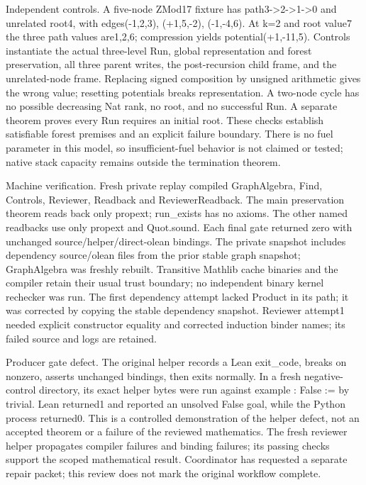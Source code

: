 \documentclass[10pt]{article}
\begin{document}
Independent controls. A five-node ZMod17 fixture has path3->2->1->0 and unrelated root4, with edges(-1,2,3), (+1,5,-2), (-1,-4,6). At k=2 and root value7 the three path values are1,2,6; compression yields potential(+1,-11,5). Controls instantiate the actual three-level Run, global representation and forest preservation, all three parent writes, the post-recursion child frame, and the unrelated-node frame. Replacing signed composition by unsigned arithmetic gives the wrong value; resetting potentials breaks representation. A two-node cycle has no possible decreasing Nat rank, no root, and no successful Run. A separate theorem proves every Run requires an initial root. These checks establish satisfiable forest premises and an explicit failure boundary. There is no fuel parameter in this model, so insufficient-fuel behavior is not claimed or tested; native stack capacity remains outside the termination theorem.\par\medskip
Machine verification. Fresh private replay compiled GraphAlgebra, Find, Controls, Reviewer, Readback and ReviewerReadback. The main preservation theorem reads back only propext; run\_exists has no axioms. The other named readbacks use only propext and Quot.sound. Each final gate returned zero with unchanged source/helper/direct-olean bindings. The private snapshot includes dependency source/olean files from the prior stable graph snapshot; GraphAlgebra was freshly rebuilt. Transitive Mathlib cache binaries and the compiler retain their usual trust boundary; no independent binary kernel rechecker was run. The first dependency attempt lacked Product in its path; it was corrected by copying the stable dependency snapshot. Reviewer attempt1 needed explicit constructor equality and corrected induction binder names; its failed source and logs are retained.\par\medskip
Producer gate defect. The original helper records a Lean exit\_code, breaks on nonzero, asserts unchanged bindings, then exits normally. In a fresh negative-control directory, its exact helper bytes were run against example : False := by trivial. Lean returned1 and reported an unsolved False goal, while the Python process returned0. This is a controlled demonstration of the helper defect, not an accepted theorem or a failure of the reviewed mathematics. The fresh reviewer helper propagates compiler failures and binding failures; its passing checks support the scoped mathematical result. Coordinator has requested a separate repair packet; this review does not mark the original workflow complete.\par\medskip
\end{document}
